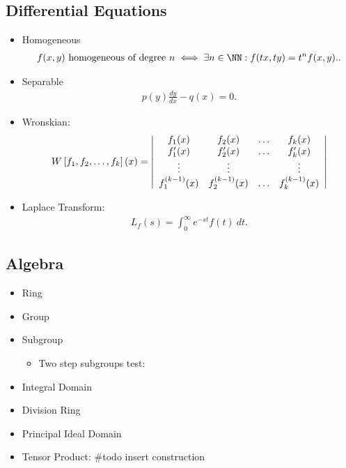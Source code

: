 \hypertarget{differential-equations}{%
\subsection{Differential Equations}\label{differential-equations}}

\begin{itemize}
\item
  Homogeneous
  \begin{align*}  
  f(x, y) \text{ homogeneous of degree } n \iff \exists n\in\NN : f(tx, ty) = t^nf(x, y).
  .\end{align*}
\item
  Separable
  \begin{align*}  
  p(y)\frac{dy}{dx} - q(x) = 0
  .\end{align*}
\item
  Wronskian:
  \begin{align*}
  W \left[ f _ { 1 } , f _ { 2 } , \ldots , f _ { k } \right] ( x ) = \left| \begin{array} { c c c c } { f _ { 1 } ( x ) } & { f _ { 2 } ( x ) } & { \dots } & { f _ { k } ( x ) } \\ { f _ { 1 } ^ { \prime } ( x ) } & { f _ { 2 } ^ { \prime } ( x ) } & { \dots } & { f _ { k } ^ { \prime } ( x ) } \\ { \vdots } & { \vdots } & { } & { \vdots } \\ { f _ { 1 } ^ { ( k - 1 ) } ( x ) } & { f _ { 2 } ^ { ( k - 1 ) } ( x ) } & { \dots } & { f _ { k } ^ { ( k - 1 ) } ( x ) } \end{array} \right|
  \end{align*}
\item
  Laplace Transform:
  \begin{align*}  
  L_f(s) = \int_0^\infty e^{-st} f(t) ~dt
  .\end{align*}
\end{itemize}

\hypertarget{algebra-1}{%
\subsection{Algebra}\label{algebra-1}}

\begin{itemize}
\tightlist
\item
  Ring
\item
  Group
\item
  Subgroup

  \begin{itemize}
  \tightlist
  \item
    Two step subgroups test:
  \end{itemize}
\item
  Integral Domain
\item
  Division Ring
\item
  Principal Ideal Domain
\item
  Tensor Product: \#todo insert construction
\end{itemize}

